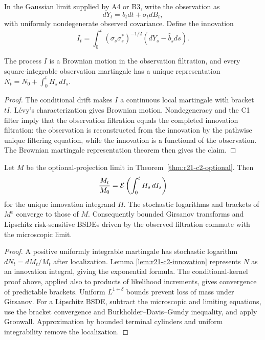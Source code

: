 In the Gaussian limit supplied by A4 or B3, write the observation as
\[
 dY_t=b_tdt+\sigma_t dB_t,
\]
with uniformly nondegenerate observed covariance.  Define the innovation
\[
 I_t=\int_0^t(\sigma_s\sigma_s^*)^{-1/2}
       (dY_s-\widehat b_sds).
\]

\begin{lemma}
\label{lem:r21-c2-innovation}
The process $I$ is a Brownian motion in the observation filtration, and every
square-integrable observation martingale has a unique representation
$N_t=N_0+\int_0^tH_s\,dI_s$.
\end{lemma}

\begin{proof}
The conditional drift makes $I$ a continuous local martingale with bracket
$tI$.  L\'evy's characterization gives Brownian motion.  Nondegeneracy and the
C1 filter imply that the observation filtration equals the completed
innovation filtration: the observation is reconstructed from the innovation
by the pathwise unique filtering equation, while the innovation is a
functional of the observation.  The Brownian martingale representation
theorem then gives the claim.
\end{proof}

\begin{theorem}
\label{thm:r21-c2-girsanov}
Let $M$ be the optional-projection limit in
Theorem~\ref{thm:r21-c2-optional}.  Then
\[
 {M_t\over M_0}=\mathcal E\left(\int_0^tH_s\,dI_s\right)
\]
for the unique innovation integrand $H$.  The stochastic logarithms and
brackets of $M^\varepsilon$ converge to those of $M$.  Consequently bounded
Girsanov transforms and Lipschitz risk-sensitive BSDEs driven by the observed
filtration commute with the microscopic limit.
\end{theorem}

\begin{proof}
A positive uniformly integrable martingale has stochastic logarithm
$dN_t=dM_t/M_t$ after localization.  Lemma
\ref{lem:r21-c2-innovation} represents $N$ as an innovation integral, giving
the exponential formula.  The conditional-kernel proof above, applied also
to products of likelihood increments, gives convergence of predictable
brackets.  Uniform $L^{1+\delta}$ bounds prevent loss of mass under Girsanov.
For a Lipschitz BSDE, subtract the microscopic and limiting equations, use the
bracket convergence and Burkholder--Davis--Gundy inequality, and apply
Gronwall.  Approximation by bounded terminal cylinders and uniform
integrability remove the localization.
\end{proof}

